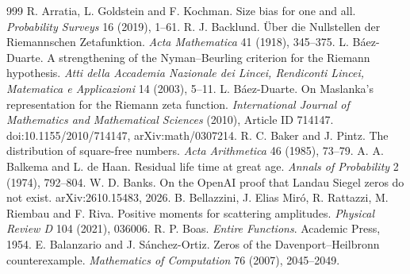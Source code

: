 \begin{thebibliography}{999}
 R. Arratia, L. Goldstein and F. Kochman. Size bias for one and all. \emph{Probability Surveys} 16 (2019), 1--61.
 R. J. Backlund. \"Uber die Nullstellen der Riemannschen Zetafunktion. \emph{Acta Mathematica} 41 (1918), 345--375.
 L. B\'aez-Duarte. A strengthening of the Nyman--Beurling criterion for the Riemann hypothesis. \emph{Atti della Accademia Nazionale dei Lincei, Rendiconti Lincei, Matematica e Applicazioni} 14 (2003), 5--11.
 L. B\'aez-Duarte. On Maslanka's representation for the Riemann zeta function. \emph{International Journal of Mathematics and Mathematical Sciences} (2010), Article ID 714147. doi:10.1155/2010/714147, arXiv:math/0307214.
 R. C. Baker and J. Pintz. The distribution of square-free numbers. \emph{Acta Arithmetica} 46 (1985), 73--79.
 A. A. Balkema and L. de Haan. Residual life time at great age. \emph{Annals of Probability} 2 (1974), 792--804.
 W. D. Banks. On the OpenAI proof that Landau Siegel zeros do not exist. arXiv:2610.15483, 2026.
 B. Bellazzini, J. Elias Mir\'o, R. Rattazzi, M. Riembau and F. Riva. Positive moments for scattering amplitudes. \emph{Physical Review D} 104 (2021), 036006.
 R. P. Boas. \emph{Entire Functions}. Academic Press, 1954.
 E. Balanzario and J. S\'anchez-Ortiz. Zeros of the Davenport--Heilbronn counterexample. \emph{Mathematics of Computation} 76 (2007), 2045--2049.

\end{thebibliography}
